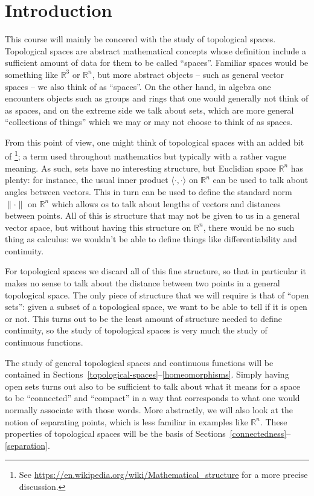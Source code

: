 \section{Introduction}
\label{introduction}
This course will mainly be concered with the study of topological spaces. Topological spaces are abstract mathematical concepts whose definition include a sufficient amount of data for them to be called ``spaces''. Familiar spaces would be something like $\mathbb{R}^3$ or $\mathbb{R}^n$, but more abstract objects -- such as general vector spaces -- we also think of as ``spaces''. On the other hand, in algebra one encounters objects such as groups and rings that one would generally not think of as spaces, and on the extreme side we talk about sets, which are more general ``collections of things'' which we may or may not choose to think of as spaces.

From this point of view, one might think of topological spaces with an added bit of \footnote{See \url{https://en.wikipedia.org/wiki/Mathematical_structure} for a more precise discussion.}; a term used throughout mathematics but typically with a rather vague meaning. As such, sets have no interesting structure, but Euclidian space $\mathbb{R}^n$ has plenty: for instance, the usual inner product $\langle \cdot ,\cdot \rangle$ on $\mathbb{R}^n$ can be used to talk about angles between vectors. This in turn can be used to define the standard norm $\lVert \cdot \rVert$ on $\mathbb{R}^n$ which allows os to talk about lengths of vectors and distances between points. All of this is structure that may not be given to us in a general vector space, but without having this structure on $\mathbb{R}^n$, there would be no such thing as calculus: we wouldn't be able to define things like differentiability and continuity.

For topological spaces we discard all of this fine structure, so that in particular it makes no sense to talk about the distance between two points in a general topological space. The only piece of structure that we will require is that of ``open sets'': given a subset of a topological space, we want to be able to tell if it is open or not. This turns out to be the least amount of structure needed to define continuity, so the study of topological spaces is very much the study of continuous functions.

The study of general topological spaces and continuous functions will be contained in Sections~\ref{topological-spaces}--\ref{homeomorphisms}. Simply having open sets turns out also to be sufficient to talk about what it means for a space to be ``connected'' and ``compact'' in a way that corresponds to what one would normally associate with those words. More abstractly, we will also look at the notion of separating points, which is less familiar in examples like $\mathbb{R}^n$. These properties of topological spaces will be the basis of Sections~\ref{connectedness}--\ref{separation}.

